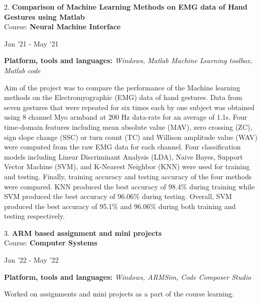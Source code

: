 \documentclass[10pt]{article}
\newenvironment{innerlist}[1][\enskip\textbullet]%
        {\begin{compactitem}[#1]}{\end{compactitem}}
\newenvironment{loneinnerlist}[1][\enskip\textbullet]%
        {\vspace{-\baselineskip}\begin{compactitem}[#1]}
        {\end{compactitem}\vspace{-.6\baselineskip}}
\begin{document}
\begin{loneinnerlist}
\item[2.]\textbf{Comparison of Machine Learning Methods on EMG data of Hand Gestures using Matlab} \\ 
\vspace{4pt}
Course: \textbf{Neural Machine Interface} \\
\vspace*{-28pt} \begin{flushright} Jan '21 - May '21 \end{flushright}
\textbf{Platform, tools and languages:} \emph{Windows, Matlab Machine Learning toolbox, Matlab code} 
\vspace*{2pt}
\begin{innerlist} \item Aim of the project was to compare the performance of the Machine learning methods on the Electromyographic (EMG) data of hand gestures. Data from seven gestures that were repeated for six times each by one subject was obtained using 8 channel Myo armband at 200 Hz data-rate for an average of 1.1s. Four time-domain features including mean absolute value (MAV), zero crossing (ZC), sign slope change (SSC) or turn count (TC) and Willison amplitude value (WAV) were computed from the raw EMG data for each channel. Four classification models including Linear Discriminant Analysis (LDA), Naive Bayes, Support Vector Machine (SVM), and K-Nearest Neighbor (KNN) were used for training and testing. Finally, training accuracy  and testing accuracy of the four methods were compared. KNN produced the best accuracy of 98.4\% during training while SVM produced the best accuracy of 96.06\% during testing. Overall, SVM produced the best accuracy of 95.1\% and 96.06\% during both training and testing respectively.
\end{innerlist}  \vspace*{6pt}

\item[3.]\textbf{ ARM based assignment and mini projects} \\ 
\vspace{4pt}
Course: \textbf{Computer Systems} \\
\vspace*{-28pt} \begin{flushright} Jan '22 - May '22 \end{flushright}
\textbf{Platform, tools and languages:} \emph{Windows, ARMSim, Code Composer Studio} 
\begin{innerlist} \item Worked on assignments and mini projects as a part of the course learning.
\end{innerlist}  \vspace*{6pt}


\end{loneinnerlist}
\end{document}
